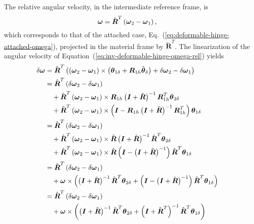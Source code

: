 \documentclass[10pt,dvips,fleqn]{report}
\newcommand{\T}[1]{\boldsymbol{#1}}
\newcommand{\TT}[1]{\boldsymbol{#1}}
\begin{document}
The relative angular velocity, in the intermediate reference frame, is
\begin{equation}
	\T{\omega} = \hat{\T{R}}^T \plbr{\T{\omega}_2 - \T{\omega}_1}
	\label{eq:inv-deformable-hinge-omega-rel} ,
\end{equation}
which corresponds to that of the attached case,
Eq.~(\ref{eq:deformable-hinge-attached-omega}),
projected in the material frame by $\tilde{\TT{R}}^T$.
The linearization of the angular velocity 
of Equation~(\ref{eq:inv-deformable-hinge-omega-rel}) yields
\begin{align}
	\delta\T{\omega}
	&= \hat{\T{R}}^T \plbr{
		\plbr{\T{\omega}_2 - \T{\omega}_1} \times \plbr{\T{\theta}_{1\delta} + \T{R}_{1h} \tilde{\T{\theta}}_{\delta}}
		+ \delta\T{\omega}_2 - \delta\T{\omega}_1
	} \\
	&= \hat{\T{R}}^T \plbr{
		\delta\T{\omega}_2 - \delta\T{\omega}_1
	} \nonumber \\
	& \mbox{\hspace{10pt}} + \hat{\T{R}}^T \plbr{\T{\omega}_2 - \T{\omega}_1} \times 
			\T{R}_{1h}\plbr{\T{I} + \tilde{\T{R}}}^{-1} \T{R}_{1h}^T \T{\theta}_{2\delta} \nonumber \\
	& \mbox{\hspace{10pt}} + \hat{\T{R}}^T \plbr{\T{\omega}_2 - \T{\omega}_1} \times
			\plbr{\T{I} - \T{R}_{1h}\plbr{\T{I} + \tilde{\T{R}}}^{-1} \T{R}_{1h}^T} \T{\theta}_{1\delta} \\
	&= \hat{\T{R}}^T \plbr{
		\delta\T{\omega}_2 - \delta\T{\omega}_1
	} \nonumber \\
	& \mbox{\hspace{10pt}} + \hat{\T{R}}^T \plbr{\T{\omega}_2 - \T{\omega}_1} \times 
			\hat{\T{R}}\plbr{\T{I} + \tilde{\T{R}}}^{-1} \hat{\T{R}}^T \T{\theta}_{2\delta} \nonumber \\
	& \mbox{\hspace{10pt}} + \hat{\T{R}}^T \plbr{\T{\omega}_2 - \T{\omega}_1} \times
			\hat{\T{R}}\plbr{\T{I} - \plbr{\T{I} + \tilde{\T{R}}}^{-1}} \hat{\T{R}}^T \T{\theta}_{1\delta} \\
	&= \hat{\T{R}}^T \plbr{
		\delta\T{\omega}_2 - \delta\T{\omega}_1
	} \nonumber \\
	& \mbox{\hspace{10pt}} + \T{\omega} \times \plbr{
		\plbr{\T{I} + \tilde{\T{R}}}^{-1} \hat{\T{R}}^T \T{\theta}_{2\delta}
		+ \plbr{\T{I} - \plbr{\T{I} + \tilde{\T{R}}}^{-1}} \hat{\T{R}}^T \T{\theta}_{1\delta}
	} \\
	&= \hat{\T{R}}^T \plbr{
		\delta\T{\omega}_2 - \delta\T{\omega}_1
	} \nonumber \\
	& \mbox{\hspace{10pt}} + \T{\omega} \times \plbr{
		\plbr{\T{I} + \tilde{\T{R}}}^{-1} \hat{\T{R}}^T \T{\theta}_{2\delta}
		+ \plbr{\T{I} + \tilde{\T{R}}^T}^{-1} \hat{\T{R}}^T \T{\theta}_{1\delta}
	}
	\label{eq:inv-deformable-hinge-omega-rel-delta}
\end{align}
\end{document}
